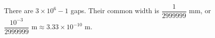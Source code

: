 There are $3\times10^6-1$ gaps. Their common width is $\dfrac{1}{2999999}$ mm, or $\boxed{\dfrac{10^{-3}}{2999999}\text{ m}\approx3.33\times10^{-10}\text{ m}}$.
